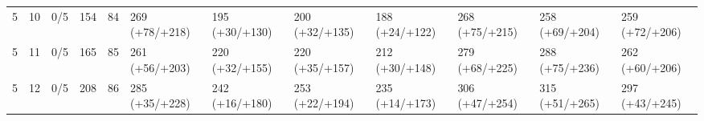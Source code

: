 \begin{table}[t]
\begin{tabular}{rrrrrlllllll}
5 & 10 & 0/5 & 154 & 84 & 269 (+78/+218) & 195 (+30/+130) & 200 (+32/+135) & 188 (+24/+122) & 268 (+75/+215) & 258 (+69/+204) & 259 (+72/+206) \\
5 & 11 & 0/5 & 165 & 85 & 261 (+56/+203) & 220 (+32/+155) & 220 (+35/+157) & 212 (+30/+148) & 279 (+68/+225) & 288 (+75/+236) & 262 (+60/+206) \\
5 & 12 & 0/5 & 208 & 86 & 285 (+35/+228) & 242 (+16/+180) & 253 (+22/+194) & 235 (+14/+173) & 306 (+47/+254) & 315 (+51/+265) & 297 (+43/+245) \\
\bottomrule
\end{tabular}
\end{table}
